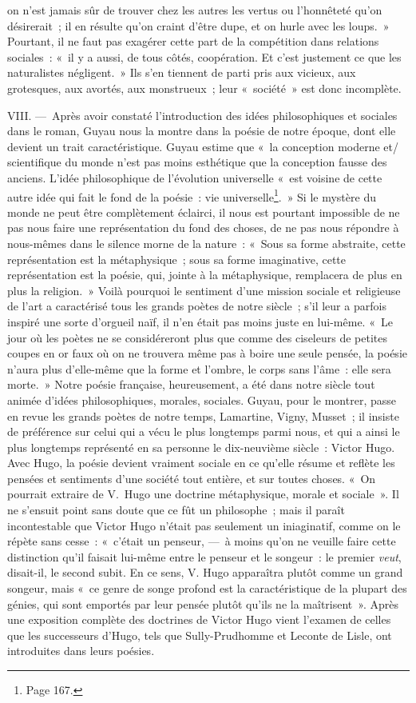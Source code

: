 \documentclass[french,twoside]{book} %
\begin{document}
on n’est jamais sûr de trouver chez les autres les vertus ou l’honnêteté qu’on désirerait ; il en résulte qu’on craint d’être dupe, et on hurle avec les loups. » Pourtant, il ne faut pas exagérer cette part de la compétition dans relations sociales : « il y a aussi, de tous côtés, coopération. Et c’est justement ce que les naturalistes négligent. » Ils s’en tiennent de parti pris aux vicieux, aux grotesques, aux avortés, aux monstrueux ; leur « société » est donc incomplète.\par
VIII. — Après avoir constaté l’introduction des idées philosophiques et sociales dans le roman, Guyau nous la montre dans la poésie de notre époque, dont elle devient un trait caractéristique. Guyau estime que « la conception moderne et/ scientifique du monde n’est pas moins esthétique que la conception fausse des anciens. L’idée philosophique de l’évolution universelle « est voisine de cette autre idée qui fait le fond de la poésie : vie universelle\footnote{Page 167.}. » Si le mystère du monde ne peut être complètement éclairci, il nous est pourtant impossible de ne pas nous faire une représentation du fond des choses, de ne pas nous répondre à nous-mêmes dans le silence morne de la nature : « Sous sa forme abstraite, cette représentation est la métaphysique ; sous sa forme imaginative, cette représentation est la poésie, qui, jointe à la métaphysique, remplacera de plus en plus la religion. » Voilà pourquoi le sentiment d’une mission sociale et religieuse de l’art a caractérisé tous les grands poètes de notre siècle ; s’il leur a parfois inspiré une sorte d’orgueil naïf, il n’en était pas moins juste en lui-même. « Le jour où les poètes ne se considéreront plus que comme des ciseleurs de petites coupes en or faux où on ne trouvera même pas à boire une seule pensée, la poésie n’aura plus d’elle-même que la forme et l’ombre, le corps sans l’âme : elle sera morte. » Notre poésie française, heureusement, a été dans notre siècle tout animée d’idées philosophiques, morales, sociales. Guyau, pour le montrer, passe en revue les grands poètes de notre temps, Lamartine, Vigny, Musset ; il insiste de préférence sur celui qui a vécu le plus longtemps parmi nous, et qui a ainsi le plus longtemps représenté en sa personne le dix-neuvième siècle : Victor Hugo. Avec Hugo, la poésie devient vraiment sociale en ce qu’elle résume et reflète les pensées et sentiments d’une société tout entière, et sur toutes choses. « On pourrait extraire de V. Hugo une doctrine métaphysique, morale et sociale ». Il ne s’ensuit point sans doute que ce fût un philosophe ; mais il paraît incontestable que Victor Hugo n’était pas seulement un iniaginatif, comme on le répète sans cesse : « c’était un penseur, — à moins qu’on ne veuille faire cette distinction qu’il faisait lui-même entre le penseur et le songeur : le premier \emph{veut}, disait-il, le second subit. En ce sens, V. Hugo apparaîtra plutôt comme un grand songeur, mais « ce genre de songe profond est la caractéristique de la plupart des génies, qui sont emportés par leur pensée plutôt qu’ils ne la maîtrisent ». Après une exposition complète des doctrines de Victor Hugo vient l’examen de celles que les successeurs d’Hugo, tels que Sully-Prudhomme et Leconte de Lisle, ont introduites dans leurs poésies.\par
\end{document}
